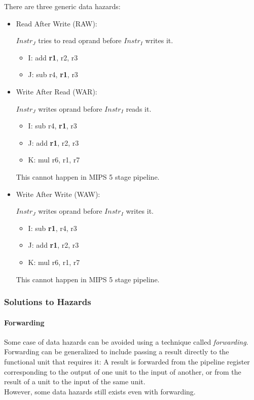 \documentclass[12pt, a4paper]{article}
\theoremstyle{margin}
\begin{document}
      There are three generic data hazards\cite{ppt}:
      \begin{itemize}
        \item Read After Write (RAW):

        $Instr_J$ tries to read oprand before $Instr_I$ writes it.
        \begin{itemize}
          \item I: add \textbf{r1}, r2, r3
          \item J: sub r4, \textbf{r1}, r3
        \end{itemize}

        \item Write After Read (WAR):

        $Instr_J$ writes oprand before $Instr_I$ reads it.
        \begin{itemize}
          \item I: sub r4, \textbf{r1}, r3
          \item J: add \textbf{r1}, r2, r3
          \item K: mul r6, r1, r7
        \end{itemize}
        This cannot happen in MIPS 5 stage pipeline.

        \item Write After Write (WAW):

        $Instr_J$ writes oprand before $Instr_I$ writes it.
        \begin{itemize}
          \item I: sub \textbf{r1}, r4, r3
          \item J: add \textbf{r1}, r2, r3
          \item K: mul r6, r1, r7
        \end{itemize}
        This cannot happen in MIPS 5 stage pipeline.

      \end{itemize}

    \subsubsection{Solutions to Hazards}

      \paragraph{Forwarding}
      Some case of data hazards can be avoided using a technique called \emph{forwarding}. Forwarding can be generalized to include passing a result directly to the functional unit that requires it: A result is forwarded from the pipeline register corresponding to the output of one unit to the input of another, or from the result of a unit to the input of the same unit.\cite{caqa}\\
      However, some data hazards still exists even with forwarding.
\end{document}
